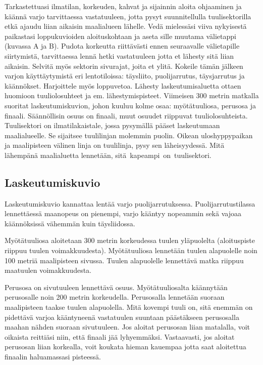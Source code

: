 \begin{multicols}{2}
Tarkastettuasi ilmatilan, korkeuden, kahvat ja sijainnin aloita ohjaaminen ja käännä varjo tarvittaessa vastatuuleen, jotta pysyt suunnitellulla tuulisektorilla etkä ajaudu liian aikaisin maalialueen lähelle. Vedä mielessäsi viiva nykyisestä paikastasi loppukuvioiden aloituskohtaan ja aseta sille muutama välietappi (kuvassa A ja B). Pudota korkeutta riittävästi ennen seuraavalle välietapille siirtymistä, tarvittaessa lennä hetki vastatuuleen jotta et lähesty sitä liian aikaisin. Selvitä myös sektorin sivurajat, joita et ylitä. Kokeile tämän jälkeen varjon käyttäytymistä eri lentotiloissa: täysliito, puolijarrutus, täysjarrutus ja käännökset. Harjoittele myös loppuvetoa. Lähesty laskeutumisaluetta ottaen huomioon tuuliolosuhteet ja em. lähestymispisteet. Viimeisen 300 metrin matkalla suoritat laskeutumiskuvion, johon kuuluu kolme osaa: myötätuuliosa, perusosa ja finaali. Säännöllisin osuus on finaali, muut osuudet riippuvat tuuliolosuhteista. Tuulisektori on ilmatilakaistale, jossa pysymällä pääset laskeutumaan maalialueelle. Se sijaitsee tuulilinjan molemmin puolin. Oikean uloshyppypaikan ja maalipisteen välinen linja on tuulilinja, pysy sen läheisyydessä. Mitä lähempänä maalialuetta lennetään, \mbox{sitä kapeampi on tuulisektori.} 


\subsection{ Laskeutumiskuvio }
\label{hyppytapahtuma-laskeutumiskuvio}


Laskeutumiskuvio kannattaa lentää varjo puolijarrutuksessa. Puolijarrutustilassa lennettäessä maanopeus on pienempi, varjo kääntyy nopeammin sekä vajoaa käännöksissä vähemmän kuin täysliidossa. 


Myötätuuliosa aloitetaan 300 metrin korkeudessa tuulen yläpuolelta (aloituspiste riippuu tuulen voimakkuudesta). Myötätuuliosa lennetään tuulen alapuolelle noin 100 metriä maalipisteen sivussa. Tuulen alapuolelle lennettävä matka riippuu maatuulen voimakkuudesta.  


Perusosa on sivutuuleen lennettävä osuus. Myötätuuliosalta käännytään perusosalle noin 200 metrin korkeudella. Perusosalla lennetään suoraan maalipisteen taakse tuulen alapuolella. Mitä kovempi tuuli on, sitä enemmän on pidettävä varjoa kääntyneenä vastatuulen suuntaan päästäkseen perusosalla maahan nähden suoraan sivutuuleen. Jos aloitat perusosan liian matalalla, voit oikaista reittiäsi niin, että finaali jää lyhyemmäksi. Vastaavasti, jos aloitat perusosan liian korkealla, voit koukata hieman kauempaa jotta saat aloitettua finaalin haluamassasi pisteessä. 



\end{multicols}
